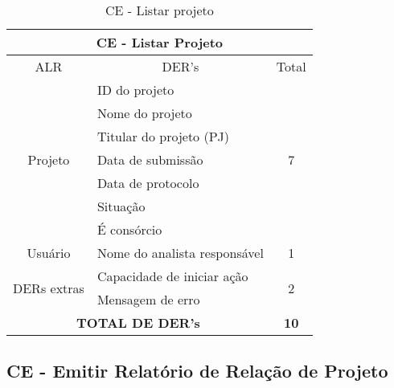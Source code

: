       \begin{table}[!h]
      \centering
      \caption{CE - Listar projeto}
      \label{ce_listar_projeto}
      \begin{tabular}{|c|l|c|}
      \hline
      \multicolumn{3}{|c|}{CE - Listar Projeto}                                                              \\ \hline
      ALR                                                & \multicolumn{1}{c|}{DER's}   & Total              \\ \hline
      \multirow{7}{*}{Projeto}                           & ID do projeto                & \multirow{7}{*}{7} \\ \cline{2-2}
							& Nome do projeto              &                    \\ \cline{2-2}
							& Titular do projeto (PJ)      &                    \\ \cline{2-2}
							& Data de submissão            &                    \\ \cline{2-2}
							& Data de protocolo            &                    \\ \cline{2-2}
							& Situação                     &                    \\ \cline{2-2}
							& É consórcio                  &                    \\ \hline
      Usuário                                            & Nome do analista responsável & 1                  \\ \hline
      \multicolumn{1}{|l|}{\multirow{2}{*}{DERs extras}} & Capacidade de iniciar ação   & \multirow{2}{*}{2} \\ \cline{2-2}
      \multicolumn{1}{|l|}{}                             & Mensagem de erro             &                    \\ \hline
      \multicolumn{2}{|c|}{\textbf{TOTAL DE DER's}}                                     & \textbf{10}        \\ \hline
      \end{tabular}
      \end{table}
  
  \subsection{CE - Emitir Relatório de Relação de Projeto}
    
